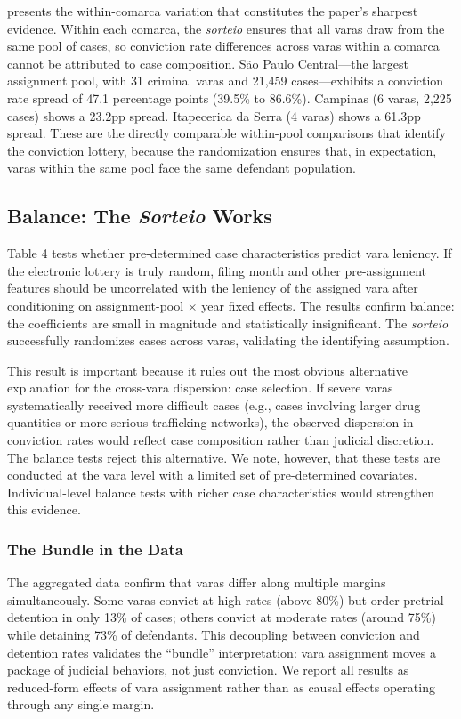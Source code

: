 \documentclass[12pt]{article}
\begin{document}
 presents the within-comarca variation that constitutes the paper's sharpest evidence. Within each comarca, the \textit{sorteio} ensures that all varas draw from the same pool of cases, so conviction rate differences across varas within a comarca cannot be attributed to case composition. S\~ao Paulo Central---the largest assignment pool, with 31 criminal varas and 21,459 cases---exhibits a conviction rate spread of 47.1 percentage points (39.5\% to 86.6\%). Campinas (6 varas, 2,225 cases) shows a 23.2pp spread. Itapecerica da Serra (4 varas) shows a 61.3pp spread. These are the directly comparable within-pool comparisons that identify the conviction lottery, because the randomization ensures that, in expectation, varas within the same pool face the same defendant population.

\subsection{Balance: The \textit{Sorteio} Works}



Table 4 tests whether pre-determined case characteristics predict vara leniency. If the electronic lottery is truly random, filing month and other pre-assignment features should be uncorrelated with the leniency of the assigned vara after conditioning on assignment-pool $\times$ year fixed effects. The results confirm balance: the coefficients are small in magnitude and statistically insignificant. The \textit{sorteio} successfully randomizes cases across varas, validating the identifying assumption.

This result is important because it rules out the most obvious alternative explanation for the cross-vara dispersion: case selection. If severe varas systematically received more difficult cases (e.g., cases involving larger drug quantities or more serious trafficking networks), the observed dispersion in conviction rates would reflect case composition rather than judicial discretion. The balance tests reject this alternative. We note, however, that these tests are conducted at the vara level with a limited set of pre-determined covariates. Individual-level balance tests with richer case characteristics would strengthen this evidence.

\subsubsection*{The Bundle in the Data} The aggregated data confirm that varas differ along multiple margins simultaneously. Some varas convict at high rates (above 80\%) but order pretrial detention in only 13\% of cases; others convict at moderate rates (around 75\%) while detaining 73\% of defendants. This decoupling between conviction and detention rates validates the ``bundle'' interpretation: vara assignment moves a package of judicial behaviors, not just conviction. We report all results as reduced-form effects of vara assignment rather than as causal effects operating through any single margin.
\end{document}
